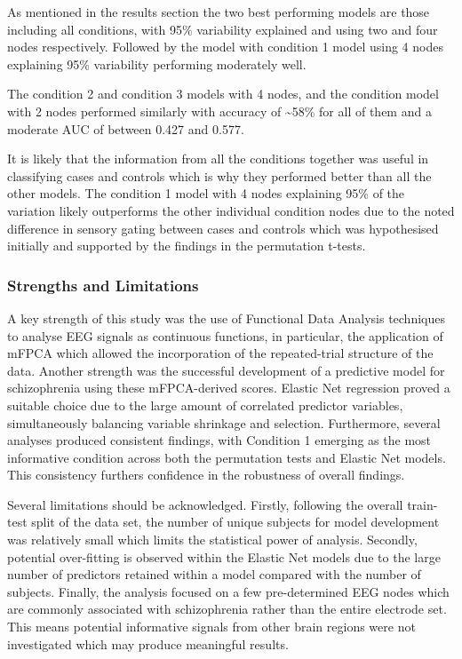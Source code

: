 \documentclass{article}
\begin{document}
As mentioned in the results section the two best performing models are
those including all conditions, with 95\% variability explained and
using two and four nodes respectively. Followed by the model with
condition 1 model using 4 nodes explaining 95\% variability performing
moderately well.

The condition 2 and condition 3 models with 4 nodes, and the condition
model with 2 nodes performed similarly with accuracy of
\textasciitilde58\% for all of them and a moderate AUC of between 0.427
and 0.577.

It is likely that the information from all the conditions together was
useful in classifying cases and controls which is why they performed
better than all the other models. The condition 1 model with 4 nodes
explaining 95\% of the variation likely outperforms the other individual
condition nodes due to the noted difference in sensory gating between
cases and controls which was hypothesised initially and supported by the
findings in the permutation t-tests.

\subsubsection{Strengths and
Limitations}\label{strengths-and-limitations}

A key strength of this study was the use of Functional Data Analysis
techniques to analyse EEG signals as continuous functions, in
particular, the application of mFPCA which allowed the incorporation of
the repeated-trial structure of the data. Another strength was the
successful development of a predictive model for schizophrenia using
these mFPCA-derived scores. Elastic Net regression proved a suitable
choice due to the large amount of correlated predictor variables,
simultaneously balancing variable shrinkage and selection. Furthermore,
several analyses produced consistent findings, with Condition 1 emerging
as the most informative condition across both the permutation tests and
Elastic Net models. This consistency furthers confidence in the
robustness of overall findings.

Several limitations should be acknowledged. Firstly, following the
overall train-test split of the data set, the number of unique subjects
for model development was relatively small which limits the statistical
power of analysis. Secondly, potential over-fitting is observed within
the Elastic Net models due to the large number of predictors retained
within a model compared with the number of subjects. Finally, the
analysis focused on a few pre-determined EEG nodes which are commonly
associated with schizophrenia rather than the entire electrode set. This
means potential informative signals from other brain regions were not
investigated which may produce meaningful results.
\end{document}

